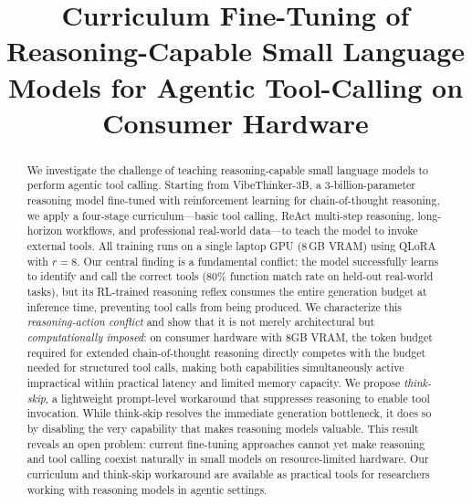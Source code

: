 \documentclass[conference]{IEEEtran}
\begin{document}
\title{Curriculum Fine-Tuning of Reasoning-Capable Small Language Models for Agentic Tool-Calling on Consumer Hardware}
\author{
}
\maketitle

\begin{abstract}
We investigate the challenge of teaching reasoning-capable small language models to perform agentic tool calling. Starting from VibeThinker-3B, a 3-billion-parameter reasoning model fine-tuned with reinforcement learning for chain-of-thought reasoning, we apply a four-stage curriculum---basic tool calling, ReAct multi-step reasoning, long-horizon workflows, and professional real-world data---to teach the model to invoke external tools. All training runs on a single laptop GPU (8\,GB VRAM) using QLoRA with $r=8$. Our central finding is a fundamental conflict: the model successfully learns to identify and call the correct tools (80\% function match rate on held-out real-world tasks), but its RL-trained reasoning reflex consumes the entire generation budget at inference time, preventing tool calls from being produced. We characterize this \textit{reasoning-action conflict} and show that it is not merely architectural but \textit{computationally imposed}: on consumer hardware with 8GB VRAM, the token budget required for extended chain-of-thought reasoning directly competes with the budget needed for structured tool calls, making both capabilities simultaneously active impractical within practical latency and limited memory capacity. We propose \textit{think-skip}, a lightweight prompt-level workaround that suppresses reasoning to enable tool invocation. While think-skip resolves the immediate generation bottleneck, it does so by disabling the very capability that makes reasoning models valuable. This result reveals an open problem: current fine-tuning approaches cannot yet make reasoning and tool calling coexist naturally in small models on resource-limited hardware. Our curriculum and think-skip workaround are available as practical tools for researchers working with reasoning models in agentic settings.
\end{abstract}
\end{document}
